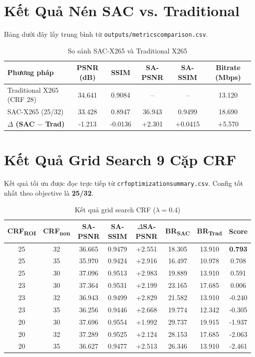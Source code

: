 \documentclass[12pt,a4paper]{article}
\begin{document}
\section{Kết Quả Nén SAC vs. Traditional}
Bảng dưới đây lấy trung bình từ \texttt{outputs/metrics\textunderscore comparison.csv}.

\begin{table}[H]
\centering
\caption{So sánh SAC-X265 và Traditional X265}
\label{tab:main_res}
\begin{tabular}{lccccc}
\toprule
\textbf{Phương pháp} & \textbf{PSNR (dB)} & \textbf{SSIM} & \textbf{SA-PSNR} & \textbf{SA-SSIM} & \textbf{Bitrate (Mbps)} \\
\midrule
Traditional X265 (CRF 28) & 34.641 & 0.9084 & -- & -- & 13.120 \\
SAC-X265 (25/32) & 33.428 & 0.8947 & 36.943 & 0.9499 & 18.690 \\
\midrule
\textbf{\(\Delta\) (SAC $-$ Trad)} & -1.213 & -0.0136 & +2.301 & +0.0415 & +5.570 \\
\bottomrule
\end{tabular}
\end{table}

\section{Kết Quả Grid Search 9 Cặp CRF}
Kết quả tối ưu được đọc trực tiếp từ \texttt{crf\textunderscore optimization\textunderscore summary.csv}. Config tốt nhất theo objective là \textbf{25/32}.

\begin{table}[H]
\centering
\caption{Kết quả grid search CRF ($\lambda=0.4$)}
\label{tab:grid}
\begin{tabular}{cccccccc}
\toprule
\textbf{CRF\textsubscript{ROI}} & \textbf{CRF\textsubscript{non}} & \textbf{SA-PSNR} & \textbf{SA-SSIM} & \textbf{$\Delta$SA-PSNR} & \textbf{BR\textsubscript{SAC}} & \textbf{BR\textsubscript{Trad}} & \textbf{Score} \\
\midrule
25 & 32 & 36.665 & 0.9479 & +2.551 & 18.305 & 13.910 & \textbf{0.793} \\
25 & 35 & 35.970 & 0.9424 & +2.916 & 16.497 & 10.978 & 0.708 \\
25 & 30 & 37.096 & 0.9513 & +2.983 & 19.889 & 13.910 & 0.591 \\
23 & 30 & 37.364 & 0.9531 & +2.199 & 23.165 & 17.685 & 0.006 \\
23 & 32 & 36.943 & 0.9499 & +2.829 & 21.582 & 13.910 & -0.240 \\
23 & 35 & 36.256 & 0.9446 & +2.668 & 19.774 & 12.342 & -0.305 \\
20 & 30 & 37.696 & 0.9554 & +1.992 & 29.737 & 19.915 & -1.937 \\
20 & 32 & 37.289 & 0.9525 & +2.124 & 28.153 & 17.685 & -2.063 \\
20 & 35 & 36.627 & 0.9477 & +2.513 & 26.346 & 13.910 & -2.461 \\
\bottomrule
\end{tabular}
\end{table}
\end{document}
